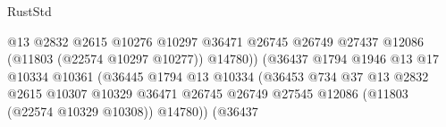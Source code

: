\begin{lexlean}{RustStd}
\begin{coremodule}
                                                            @13
                                                            @2832
                                                            @2615
                                                            @10276
                                                            @10297
                                                            @36471
                                                            @26745
                                                            @26749
                                                            @27437
                                                            @12086
                                                            (@11803 (@22574 @10297 @10277))
                                                            @14780))
                                                        (@36437
                                                          @1794
                                                          @1946
                                                          @13
                                                          @17
                                                          @10334
                                                          @10361
                                                          (@36445
                                                            @1794
                                                            @13
                                                            @10334
                                                            (@36453
                                                              @734
                                                              @37
                                                              @13
                                                              @2832
                                                              @2615
                                                              @10307
                                                              @10329
                                                              @36471
                                                              @26745
                                                              @26749
                                                              @27545
                                                              @12086
                                                              (@11803 (@22574 @10329 @10308))
                                                              @14780))
                                                          (@36437

\end{coremodule}
\end{lexlean}
